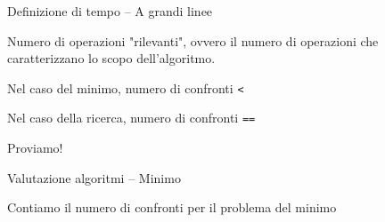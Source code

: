 \begin{frame}{Definizione di tempo -- A grandi linee}

\begin{myboxtitle}
Numero di operazioni "rilevanti", ovvero il numero di operazioni che caratterizzano lo scopo dell'algoritmo.
\end{myboxtitle}

\begin{myboxtitle}[Esempio]
\BIL
\item Nel caso del minimo, numero di confronti \texttt{<}
\item Nel caso della ricerca, numero di confronti \texttt{==}
\EIL
\end{myboxtitle}

\begin{mybox}
\alert{Proviamo!}
\end{mybox}


\end{frame}


\begin{frame}[shrink=10]{Valutazione algoritmi -- Minimo}

\begin{mybox}
Contiamo il numero di confronti per il problema del \alert{minimo}
\end{mybox}


\end{frame}

